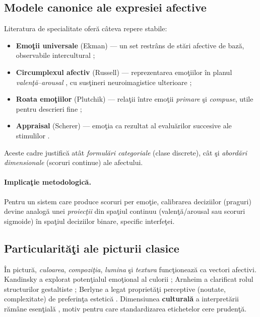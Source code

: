 \subsection{Modele canonice ale expresiei afective}

Literatura de specialitate oferă câteva repere stabile:
\begin{itemize}[leftmargin=*, itemsep=2pt, topsep=2pt]
  \item \textbf{Emoţii universale} (Ekman) — un set restrâns de stări afective de bază, observabile intercultural \cite{ekman1992argument};
  \item \textbf{Circumplexul afectiv} (Russell) — reprezentarea emoţiilor în planul \emph{valenţă}–\emph{arousal} \cite{russell1980circumplex}, cu susţineri neuroimagistice ulterioare \cite{posner2005circumplex};
  \item \textbf{Roata emoţiilor} (Plutchik) — relaţii între emoţii \emph{primare} şi \emph{compuse}, utile pentru descrieri fine \cite{plutchik1980general};
  \item \textbf{Appraisal} (Scherer) — emoţia ca rezultat al evaluărilor succesive ale stimulilor \cite{scherer2001appraisal}.
\end{itemize}
Aceste cadre justifică atât \emph{formulări categoriale} (clase discrete), cât şi \emph{abordări dimensionale} (scoruri continue) ale afectului.

\paragraph{Implicaţie metodologică.} Pentru un sistem care produce scoruri per emoţie, calibrarea deciziilor (praguri) devine analogă unei \emph{proiecţii} din spaţiul continuu (valenţă/arousal sau scoruri sigmoide) în spaţiul deciziilor binare, specific interfeţei.

\subsection{Particularităţi ale picturii clasice}

În pictură, \emph{culoarea}, \emph{compoziţia}, \emph{lumina} şi \emph{textura} funcţionează ca vectori afectivi. Kandinsky a explorat potenţialul emoţional al culorii \cite{kandinsky1977concerning}; Arnheim a clarificat rolul structurilor gestaltiste \cite{arnheim1974art}; Berlyne a legat proprietăţi perceptive (noutate, complexitate) de preferinţa estetică \cite{berlyne1971aesthetics}. Dimensiunea \textbf{culturală} a interpretării rămâne esenţială \cite{mesquita1992cultural,kitayama1991culture}, motiv pentru care standardizarea etichetelor cere prudenţă.

